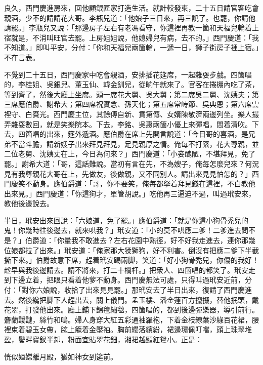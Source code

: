 良久，西門慶進房來，回他顧銀匠家打造生活。就計較發柬，二十五日請官客吃會親酒，少不的請請花大哥。李瓶兒道：「他娘子三日來，再三說了。也罷，你請他請罷。」李瓶兒又說：「那邊房子左右有老馮看守，你這裡再教一箇和天福兒輪着上宿就是，不消叫旺官去罷。上房姐姐說，他媳婦兒有病，去不的。」{}西門慶道：「我不知道。」即叫平安，分付：「你和天福兒兩箇輪，一遞一日，獅子街房子裡上宿。」不在言表。

不覺到二十五日，西門慶家中吃會親酒，安排插花筵席，一起雜耍步戲。四箇唱的，李桂姐、吳銀兒、董玉仙、韓金釧兒，從晌午就來了。官客在捲棚內吃了茶，等到齊了，然後大廳上坐席。頭一席花大舅、吳大舅；第二席吳二舅、沈姨夫；第三席應伯爵、謝希大；第四席祝實念、孫天化；第五席常峙節、吳典恩；第六席雲裡守、白賚光。西門慶主位，其餘傅自新、賁第傳、女婿陳敬濟兩邊列坐。樂人撮弄雜耍數回，就是笑樂院本。下去，李銘、吳惠兩箇小優上來彈唱，間着清吹。下去，四箇唱的出來，筵外遞酒。應伯爵在席上先開言說道：「今日哥的喜酒，是兄弟不當斗膽，請新嫂子出來拜見拜見，足見親厚之情。俺每不打緊，花大尊親，並二位老舅、沈姨丈在上，今日為何來？」西門慶道：「小妾醜陋，不堪拜見，免了罷。」謝希大道：「哥，這話難說。當初有言在先，不為嫂子，俺每怎麼兒來？何況見有我尊親花大哥在上，先做友，後做親，又不同別人。請出來見見怕怎的？」西門慶笑不動身。應伯爵道：「哥，你不要笑，俺每都拏着拜見錢在這裡，不白教他出來見。」西門慶道：「你這狗才，單管胡說。」吃他再三逼迫不過，叫過玳安來，教他後邊說去。

半日，玳安出來回說：「六娘道，免了罷。」應伯爵道：「就是你這小狗骨禿兒的鬼！你幾時往後邊去，就來哄我？」玳安道：「小的莫不哄應二爹！二爹進去問不是？」伯爵道：「你量我不敢進去？左右花園中熟徑，好不好我走進去，連你那幾位娘都拉了出來。」玳安道：「俺家那大猱獅狗，好不利害。倒沒有把應二爹下半截撕下來。」伯爵故意下席，趕着玳安踢兩脚，笑道：「好小狗骨禿兒，你傷的我好！趁早與我後邊請去。請不將來，打二十欄杆。」把衆人、四箇唱的都笑了。玳安走到下邊立着，把眼只看着他爹不動身。西門慶無法可處，只得叫過玳安近前，分付：「對你六娘說，收拾了出來見見罷。」那玳安去了半日出來，復請了西門慶進去。然後纔把脚下人趕出去，關上儀門。孟玉樓、潘金蓮百方攛掇，替他抿頭，戴花翠，打發他出來。廳上鋪下錦氊繡毯，四箇唱的，都到後邊彈樂器，導引前行。麝蘭靉靆，絲竹和鳴。婦人身穿大紅五彩通袖羅袍，下着金枝線葉沙綠百花裙，腰裡束着碧玉女帶，腕上籠着金壓袖。胸前纓落繽紛，裙邊環佩叮噹，頭上珠翠堆盈，鬢畔寶釵半卸，粉面宜貼翠花鈿，湘裙越顯紅鴛小。正是：

\begin{myquote} 
恍似姮嫦離月殿，猶如神女到筵前。
\end{myquote} 

